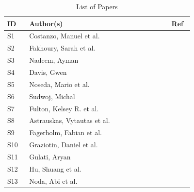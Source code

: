 \documentclass[conference]{IEEEtran}
\begin{document}
\begin{table}[!htbp]
    \caption{List of Papers}
    \label{tab:primary_papers}
    \centering
    \def\arraystretch{1.3}
    \begin{tabular}{p{0.1\linewidth}p{0.65\linewidth}p{0.1\linewidth}}
        \hline
        ID  & Author(s)                            & Ref                                                         \\
        \hline
        \hline
        S1  & Costanzo, Manuel et al.              & \cite{costanzoPerformanceVsProgramming2021}                 \\
        \hline
        S2  & Fakhoury, Sarah et al.               & \cite{fakhouryEffectPoorSource2018}                         \\
        \hline
        S3  & Nadeem, Ayman                        & \cite{nadeemHumancenteredApproachStaticanalysisdriven2022a} \\
        \hline
        S4  & Davis, Gwen                          & \cite{davisDeveloperExperienceWhat2023}                     \\
        \hline
        S5  & Noseda, Mario et al.                 & \cite{nosedaRustSecureIoT2022}                              \\
        \hline
        S6  & Sudwoj, Michal                       & \cite{sudwojRustProgrammingLanguage2020}                    \\
        \hline
        S7  & Fulton, Kelsey R. et al.             & \cite{fultonBenefitsDrawbacksAdopting2021}                  \\
        \hline
        S8  & Astrauskas, Vytautas et al.          & \cite{astrauskasHowProgrammersUse2020}                      \\
        \hline
        S9  & Fagerholm, Fabian et al.             & \cite{fagerholmDeveloperExperienceConcept2012}              \\
        \hline
        S10 & Graziotin, Daniel et al.             & \cite{graziotin2015you}                                     \\
        \hline
        S11 & Gulati, Aryan                        & \cite{gulati2022can}                                        \\
        \hline
        S12 & Hu, Shuang et al.                    & \cite{huComprehensivenessAutomationLifecycle2022}           \\
        \hline
        S13 & Noda, Abi et al.                     & \cite{nodaDevExWhatActually2023}                            \\

\end{tabular}
\end{table}
\end{document}
